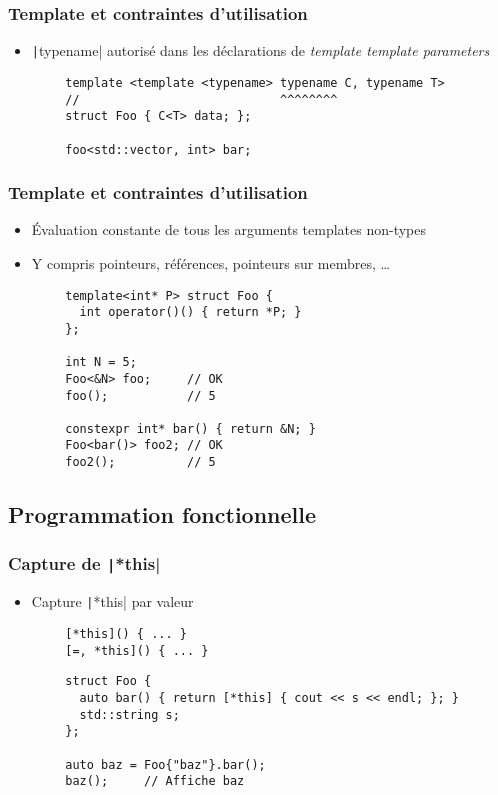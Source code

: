 \documentclass[C++.tex]{subfiles}
\begin{document}
\begin{frame}[fragile]
	\frametitle{Template et contraintes d'utilisation}
	\begin{itemize}
		\item \texttt|typename| autorisé dans les déclarations de \textit{template template parameters}
	\end{itemize}

	\begin{verbatim}
		template <template <typename> typename C, typename T>
		//                            ^^^^^^^^
		struct Foo { C<T> data; };

		foo<std::vector, int> bar;
	\end{verbatim}

\end{frame}

\begin{frame}[fragile]
	\frametitle{Template et contraintes d'utilisation}
	\begin{itemize}
		\item Évaluation constante de tous les arguments templates \og non-types\fg{}
		\item Y compris pointeurs, références, pointeurs sur membres, \ldots{}
	\end{itemize}

	\begin{verbatim}
		template<int* P> struct Foo {
		  int operator()() { return *P; }
		};

		int N = 5;
		Foo<&N> foo;     // OK
		foo();           // 5

		constexpr int* bar() { return &N; }
		Foo<bar()> foo2; // OK
		foo2();          // 5
	\end{verbatim}
\end{frame}

\subsection*{Programmation fonctionnelle}
\begin{frame}[fragile]
	\frametitle{Capture de \texttt|*this|}
	\begin{itemize}
		\item Capture \texttt|*this| par valeur
	\end{itemize}

	\begin{verbatim}
		[*this]() { ... }
		[=, *this]() { ... }
	\end{verbatim}

	\begin{verbatim}
		struct Foo {
		  auto bar() { return [*this] { cout << s << endl; }; }
		  std::string s;
		};

		auto baz = Foo{"baz"}.bar();
		baz();     // Affiche baz
	\end{verbatim}

\end{frame}
\end{document}
